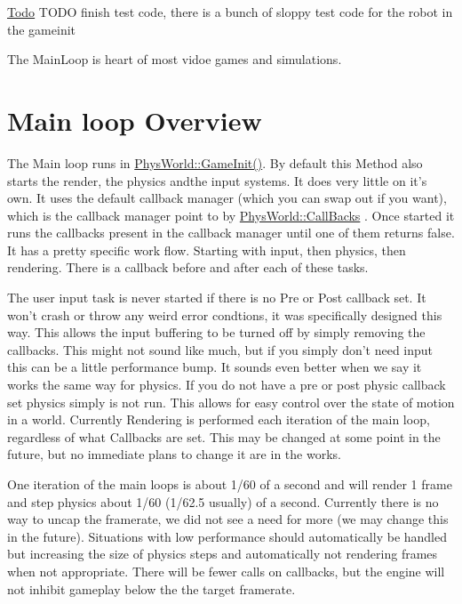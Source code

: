 \begin{Desc}
\item[\hyperlink{todo__todo000010}{Todo}]TODO finish test code, there is a bunch of sloppy test code for the robot in the gameinit \end{Desc}


The MainLoop is heart of most vidoe games and simulations.\hypertarget{mainloop1_overview1}{}\section{Main loop Overview}\label{mainloop1_overview1}
The Main loop runs in \hyperlink{classPhysWorld_a6d65a7412c1711497fbd1173f879243a}{PhysWorld::GameInit()}. By default this Method also starts the render, the physics andthe input systems. It does very little on it's own. It uses the default callback manager (which you can swap out if you want), which is the callback manager point to by \hyperlink{classPhysWorld_a080ea6f1584374b07d3c1f29c7ed64df}{PhysWorld::CallBacks} . Once started it runs the callbacks present in the callback manager until one of them returns false. It has a pretty specific work flow. Starting with input, then physics, then rendering. There is a callback before and after each of these tasks. \par
 \par
 The user input task is never started if there is no Pre or Post callback set. It won't crash or throw any weird error condtions, it was specifically designed this way. This allows the input buffering to be turned off by simply removing the callbacks. This might not sound like much, but if you simply don't need input this can be a little performance bump. It sounds even better when we say it works the same way for physics. If you do not have a pre or post physic callback set physics simply is not run. This allows for easy control over the state of motion in a world. Currently Rendering is performed each iteration of the main loop, regardless of what Callbacks are set. This may be changed at some point in the future, but no immediate plans to change it are in the works. \par
 \par
 One iteration of the main loops is about 1/60 of a second and will render 1 frame and step physics about 1/60 (1/62.5 usually) of a second. Currently there is no way to uncap the framerate, we did not see a need for more (we may change this in the future). Situations with low performance should automatically be handled but increasing the size of physics steps and automatically not rendering frames when not appropriate. There will be fewer calls on callbacks, but the engine will not inhibit gameplay below the the target framerate. \par
